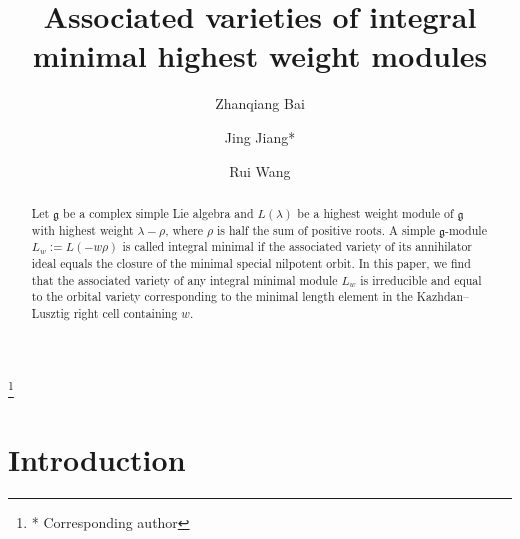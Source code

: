 \documentclass[11pt, reqno]{amsart}
\def\fgg{\mathfrak{g}}
\theoremstyle{definition}
\numberwithin{equation}{section}
\begin{document}
\title[Minimal highest weight modules]{Associated varieties of integral 
minimal  highest weight modules}

\author{Zhanqiang Bai}
\address[Bai]{School of Mathematical Sciences, Soochow University, Suzhou 215006, P. R. China}

\author{Jing Jiang*}
\thanks{* Corresponding author}
\address[Jiang]{
School of Mathematical Sciences, East China Normal University, Shanghai 200241, China} 


\author{Rui Wang}
\address[Wang]{School of Mathematical Sciences, Soochow University, Suzhou 215006, P. R. China}





\bigskip

\begin{abstract}
Let $\mathfrak{g}$ be a complex simple Lie algebra and $L(\lambda)$ be a highest weight  module of $\mathfrak{g}$ with highest weight $\lambda-\rho$, where $\rho$ is half the sum of positive roots.    A simple  $\fgg$-module $L_w:=L(-w\rho)$ is called 
 integral minimal if the associated variety of its annihilator ideal equals the closure of the minimal special nilpotent orbit. 
  In this paper, we  find that the  associated variety of  any integral minimal module $L_w$ is irreducible and equal to the orbital variety corresponding to the minimal length element in the Kazhdan--Lusztig right cell containing $w$. 





\end{abstract}

\maketitle

	\tableofcontents
\section{ Introduction}
\end{document}
